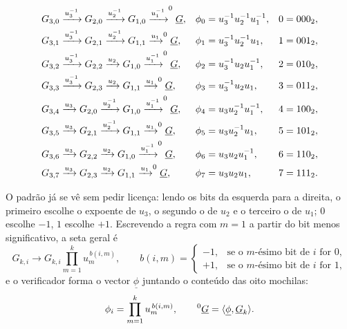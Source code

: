 \[
\begin{aligned}
G_{3,0}&\xrightarrow{u_3^{-1}}G_{2,0}
         \xrightarrow{u_2^{-1}}G_{1,0}
         \xrightarrow{u_1^{-1}}^{0}_{\ }\underline G,
&\phi_0&=u_3^{-1}u_2^{-1}u_1^{-1},&0&=000_2,\\
G_{3,1}&\xrightarrow{u_3^{-1}}G_{2,1}
         \xrightarrow{u_2^{-1}}G_{1,1}
         \xrightarrow{u_1}^{0}_{\ }\underline G,
&\phi_1&=u_3^{-1}u_2^{-1}u_1,&1&=001_2,\\
G_{3,2}&\xrightarrow{u_3^{-1}}G_{2,2}
         \xrightarrow{u_2}G_{1,0}
         \xrightarrow{u_1^{-1}}^{0}_{\ }\underline G,
&\phi_2&=u_3^{-1}u_2u_1^{-1},&2&=010_2,\\
G_{3,3}&\xrightarrow{u_3^{-1}}G_{2,3}
         \xrightarrow{u_2}G_{1,1}
         \xrightarrow{u_1}^{0}_{\ }\underline G,
&\phi_3&=u_3^{-1}u_2u_1,&3&=011_2,\\
G_{3,4}&\xrightarrow{u_3}G_{2,0}
         \xrightarrow{u_2^{-1}}G_{1,0}
         \xrightarrow{u_1^{-1}}^{0}_{\ }\underline G,
&\phi_4&=u_3u_2^{-1}u_1^{-1},&4&=100_2,\\
G_{3,5}&\xrightarrow{u_3}G_{2,1}
         \xrightarrow{u_2^{-1}}G_{1,1}
         \xrightarrow{u_1}^{0}_{\ }\underline G,
&\phi_5&=u_3u_2^{-1}u_1,&5&=101_2,\\
G_{3,6}&\xrightarrow{u_3}G_{2,2}
         \xrightarrow{u_2}G_{1,0}
         \xrightarrow{u_1^{-1}}^{0}_{\ }\underline G,
&\phi_6&=u_3u_2u_1^{-1},&6&=110_2,\\
G_{3,7}&\xrightarrow{u_3}G_{2,3}
         \xrightarrow{u_2}G_{1,1}
         \xrightarrow{u_1}^{0}_{\ }\underline G,
&\phi_7&=u_3u_2u_1,&7&=111_2.
\end{aligned}
\]

O padrão já se vê sem pedir licença: lendo os bits da esquerda para a direita,
o primeiro escolhe o expoente de \(u_3\), o segundo o de \(u_2\) e o terceiro
o de \(u_1\); \(0\) escolhe \(-1\), \(1\) escolhe \(+1\). Escrevendo a regra
com \(m=1\) a partir do bit menos significativo, a seta geral é
\begin{equation}
 G_{k,i}\longrightarrow
 G_{k,i}\prod_{m=1}^{k}u_m^{\,b(i,m)},
 \qquad
 b(i,m)=
 \begin{cases}
  -1,&\text{se o \(m\)-ésimo bit de \(i\) for 0},\\
  +1,&\text{se o \(m\)-ésimo bit de \(i\) for 1},
 \end{cases}
\label{eq:bp-g-arrow}
\end{equation}
e o verificador forma o vector \(\underline\phi\) juntando o conteúdo das oito
mochilas:
\[
 \phi_i=\prod_{m=1}^{k}u_m^{\,b(i,m)},\qquad
 ^{0}_{\ }\underline G=\langle\underline\phi,\underline G_k\rangle.
\]

